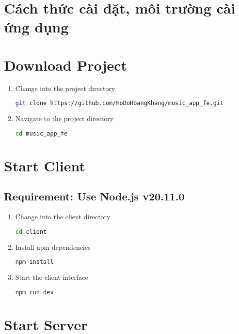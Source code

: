 \documentclass[a4paper]{article}
\begin{document}
\newpage
\section{Cách thức cài đặt, môi trường cài ứng dụng}

\section*{Download Project}
\begin{enumerate}
  \item Change into the project directory
  \begin{lstlisting}[language=bash]
  git clone https://github.com/HoDoHoangKhang/music_app_fe.git
  \end{lstlisting}
  
  \item Navigate to the project directory
  \begin{lstlisting}[language=bash]
  cd music_app_fe
  \end{lstlisting}
\end{enumerate}

\section*{Start Client}
\subsection*{Requirement: Use Node.js v20.11.0}
\begin{enumerate}
  \item Change into the client directory
  \begin{lstlisting}[language=bash]
  cd client
  \end{lstlisting}
  
  \item Install npm dependencies
  \begin{lstlisting}[language=bash]
  npm install
  \end{lstlisting}
  
  \item Start the client interface
  \begin{lstlisting}[language=bash]
  npm run dev
  \end{lstlisting}
\end{enumerate}

\section*{Start Server}
\end{document}
